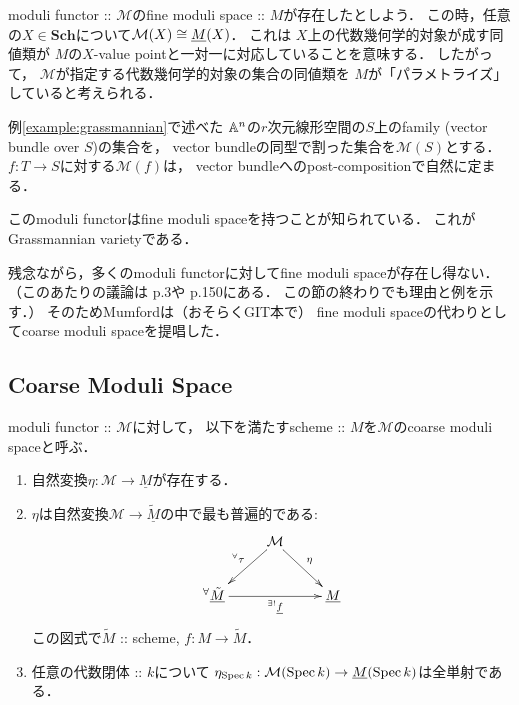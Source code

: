 \documentclass[a4paper]{jsarticle}
\newcommand{\Sch}{\mathbf{Sch}}
\newcommand{\func}[1]{\underline{#1}}
\newcommand{\ftorM}{\mathcal{M}}
\begin{document}
    \begin{Remark}
        moduli functor :: $\ftorM$のfine moduli space :: $M$が存在したとしよう．
        この時，任意の$X \in \Sch$について$\ftorM(X) \iso \func{M}(X)$．
        これは
        $X$上の代数幾何学的対象が成す同値類が
        $M$の$X$-value pointと一対一に対応していることを意味する．
        したがって，
        $\ftorM$が指定する代数幾何学的対象の集合の同値類を
        $M$が「パラメトライズ」していると考えられる．
    \end{Remark}

    \begin{Example}
        例\ref{example:grassmannian}で述べた
        $\mathbb{A}^n$の$r$次元線形空間の$S$上のfamily
        (vector bundle over $S$)の集合を，
        vector bundleの同型で割った集合を$\ftorM(S)$とする．
        $f: T \to S$に対する$\ftorM(f)$は，
        vector bundleへのpost-compositionで自然に定まる．

        このmoduli functorはfine moduli spaceを持つことが知られている．
        これがGrassmannian varietyである．
    \end{Example}

    残念ながら，多くのmoduli functorに対してfine moduli spaceが存在し得ない．
    （このあたりの議論は\cite{HaMo} p.3や\cite{HarDef} p.150にある．
    この節の終わりでも理由と例を示す．）
    そのためMumfordは（おそらくGIT本で）
    fine moduli spaceの代わりとしてcoarse moduli spaceを提唱した．

    \subsection{Coarse Moduli Space}
    \begin{Def}
        moduli functor :: $\ftorM$に対して，
        以下を満たすscheme :: $M$を$\ftorM$のcoarse moduli spaceと呼ぶ．
        \begin{enumerate}[label=(\roman*), leftmargin=*]
            \item
                自然変換$\eta: \ftorM \to \func{M}$が存在する．
            \item
                $\eta$は自然変換$\ftorM \to \func{\tilde{M}}$の中で最も普遍的である:
                \[
                \xymatrix
                {
                    {} & \ar[ld]_-{{}^{\forall} \tau}\ftorM \ar[rd]^-{\eta}& {} \\
                    {}^{\forall}\func{\tilde{M}} \ar[rr]_-{{}^{\exists!} \func{f}}& {} & \func{M}
                }
                \]
                この図式で$\tilde{M}$ :: scheme, $f: M \to \tilde{M}$．
            \item
                任意の代数閉体 :: $k$について
                $\eta_{\Spec k}: \ftorM(\Spec k) \to \func{M}(\Spec k)$は全単射である．
        \end{enumerate}
    \end{Def}
\end{document}
